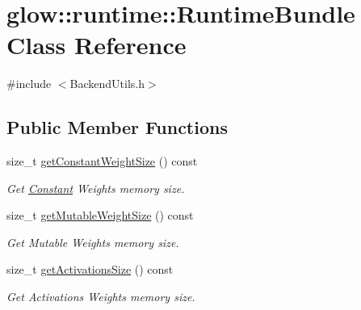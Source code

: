 \hypertarget{classglow_1_1runtime_1_1_runtime_bundle}{}\section{glow\+:\+:runtime\+:\+:Runtime\+Bundle Class Reference}
\label{classglow_1_1runtime_1_1_runtime_bundle}


{\ttfamily \#include $<$Backend\+Utils.\+h$>$}

\subsection*{Public Member Functions}
\begin{DoxyCompactItemize}
\item 
\mbox{\label{classglow_1_1runtime_1_1_runtime_bundle_aa7bce0d1b4de07c426fadf7356ff290b}} 
size\+\_\+t \hyperlink{classglow_1_1runtime_1_1_runtime_bundle_aa7bce0d1b4de07c426fadf7356ff290b}{get\+Constant\+Weight\+Size} () const
\begin{DoxyCompactList}\small\item\em Get \hyperlink{classglow_1_1_constant}{Constant} Weights memory size. \end{DoxyCompactList}\item 
\mbox{\label{classglow_1_1runtime_1_1_runtime_bundle_a6d86984311509c9b43052d535547b581}} 
size\+\_\+t \hyperlink{classglow_1_1runtime_1_1_runtime_bundle_a6d86984311509c9b43052d535547b581}{get\+Mutable\+Weight\+Size} () const
\begin{DoxyCompactList}\small\item\em Get Mutable Weights memory size. \end{DoxyCompactList}\item 
\mbox{\label{classglow_1_1runtime_1_1_runtime_bundle_a835538bd946378a9d1fbf026a62a4dfe}} 
size\+\_\+t \hyperlink{classglow_1_1runtime_1_1_runtime_bundle_a835538bd946378a9d1fbf026a62a4dfe}{get\+Activations\+Size} () const
\begin{DoxyCompactList}\small\item\em Get Activations Weights memory size. \end{DoxyCompactList}\item 

\end{DoxyCompactItemize}
